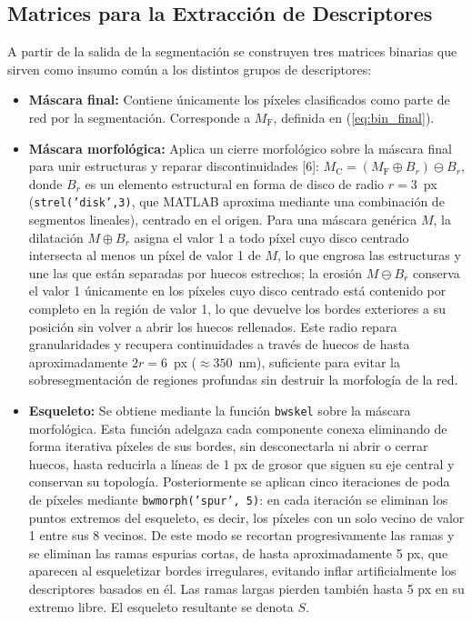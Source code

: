 \subsection{Matrices para la Extracción de Descriptores}
\label{sec:met_representaciones}

A partir de la salida de la segmentación se construyen tres matrices binarias que sirven como insumo común a los distintos grupos de descriptores:

\begin{itemize}
    \item \textbf{Máscara final:} Contiene únicamente los píxeles clasificados como parte de red por la segmentación. Corresponde a $M_{\mathrm{F}}$, definida en (\ref{eq:bin_final}).
    \item \textbf{Máscara morfológica:} Aplica un cierre morfológico sobre la máscara final para unir estructuras y reparar discontinuidades [6]: $M_{\mathrm{C}} = (M_{\mathrm{F}} \oplus B_r) \ominus B_r$, donde $B_r$ es un elemento estructural en forma de disco de radio $r = 3$~px (\texttt{strel('disk',3)}, que MATLAB aproxima mediante una combinación de segmentos lineales), centrado en el origen. Para una máscara genérica $M$, la dilatación $M \oplus B_r$ asigna el valor 1 a todo píxel cuyo disco centrado intersecta al menos un píxel de valor 1 de $M$, lo que engrosa las estructuras y une las que están separadas por huecos estrechos; la erosión $M \ominus B_r$ conserva el valor 1 únicamente en los píxeles cuyo disco centrado está contenido por completo en la región de valor 1, lo que devuelve los bordes exteriores a su posición sin volver a abrir los huecos rellenados. Este radio repara granularidades y recupera continuidades a través de huecos de hasta aproximadamente $2r = 6$~px ($\approx 350$~nm), suficiente para evitar la sobresegmentación de regiones profundas sin destruir la morfología de la red.
    \item \textbf{Esqueleto:} Se obtiene mediante la función \texttt{bwskel} sobre la máscara morfológica. Esta función adelgaza cada componente conexa eliminando de forma iterativa píxeles de sus bordes, sin desconectarla ni abrir o cerrar huecos, hasta reducirla a líneas de 1 px de grosor que siguen su eje central y conservan su topología. Posteriormente se aplican cinco iteraciones de poda de píxeles mediante \texttt{bwmorph(\texttt{'spur'}, 5)}: en cada iteración se eliminan los puntos extremos del esqueleto, es decir, los píxeles con un solo vecino de valor 1 entre sus 8 vecinos. De este modo se recortan progresivamente las ramas y se eliminan las ramas espurias cortas, de hasta aproximadamente 5 px, que aparecen al esqueletizar bordes irregulares, evitando inflar artificialmente los descriptores basados en él. Las ramas largas pierden también hasta 5 px en su extremo libre. El esqueleto resultante se denota $S$.
\end{itemize}


